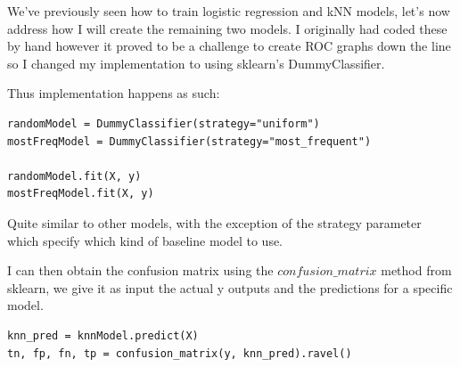 \documentclass[10pt]{article}
\begin{document}
We've previously seen how to train logistic regression and kNN models, let's now address how I will
create the remaining two models. I originally had coded these by hand however it proved to be a challenge
to create ROC graphs down the line so I changed my implementation to using sklearn's DummyClassifier.

Thus implementation happens as such:

\begin{lstlisting}
randomModel = DummyClassifier(strategy="uniform")
mostFreqModel = DummyClassifier(strategy="most_frequent")

randomModel.fit(X, y)
mostFreqModel.fit(X, y)
\end{lstlisting}

Quite similar to other models, with the exception of the strategy parameter which specify which kind of
baseline model to use.

I can then obtain the confusion matrix using the $confusion\_matrix$ method from sklearn,
we give it as input the actual y outputs and the predictions for a specific model.
\begin{lstlisting}
knn_pred = knnModel.predict(X)
tn, fp, fn, tp = confusion_matrix(y, knn_pred).ravel()
\end{lstlisting}
\end{document}
